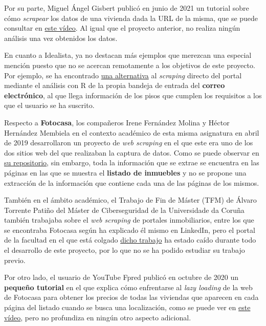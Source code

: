 \documentclass[12pt]{article}
\begin{document}
Por su parte, Miguel Ángel Gisbert publicó en junio de 2021 un tutorial sobre cómo \textit{scrapear} los datos de una vivienda dada la URL de la misma, que se puede consultar en \href{https://www.youtube.com/watch?v=2UyJv5oe570}{este vídeo}. Al igual que el proyecto anterior, no realiza ningún análisis una vez obtenidos los datos. 

En cuanto a Idealista, ya no destacan más ejemplos que merezcan una especial mención puesto que no se acercan remotamente a los objetivos de este proyecto. Por ejemplo, se ha encontrado \href{https://medium.com/@rubenmarcos/crear-una-base-de-datos-de-la-evoluci%C3%B3n-del-mercado-inmobiliario-con-idealista-y-r-y-sin-scraping-1d5025a9d47e}{una alternativa} al \textit{scraping} directo del portal mediante el análisis con R de la propia bandeja de entrada del \textbf{correo electrónico}, al que llega información de los pisos que cumplen los requisitos a los que el usuario se ha suscrito.

Respecto a \textbf{Fotocasa}, los compañeros Irene Fernández Molina y Héctor Hernández Membiela en el contexto académico de esta misma asignatura en abril de 2019 desarrollaron un proyecto de \textit{web scraping} en el que este era uno de los dos sitios web del que realizaban la captura de datos. Como se puede observar en \href{https://github.com/EdelBlau/PEC_TPC}{su repositorio}, sin embargo, toda la información que se extrae se encuentra en las páginas en las que se muestra el \textbf{listado de inmuebles} y no se propone una extracción de la información que contiene cada una de las páginas de los mismos. 

También en el ámbito académico, el Trabajo de Fin de Máster (TFM) de Álvaro Torrente Patiño del Máster de Ciberseguridad de la Universidade da Coruña también trabajaba sobre el \textit{web scraping} de portales inmobiliarios, entre los que se encontraba Fotocasa según ha explicado él mismo en LinkedIn, pero el portal de la facultad en el que está colgado \href{http://castor.det.uvigo.es:8080/xmlui/bitstream/handle/123456789/575/TorrentePatino_Alvaro_TFM_2021.pdf?sequence=1&isAllowed=y}{dicho trabajo} ha estado caído durante todo el desarrollo de este proyecto, por lo que no se ha podido estudiar su trabajo previo. 

Por otro lado, el usuario de YouTube Fpred publicó en octubre de 2020 un \textbf{pequeño tutorial} en el que explica cómo enfrentarse al \textit{lazy loading} de la web de Fotocasa para obtener los precios de todas las viviendas que aparecen en cada página del listado cuando se busca una localización, como se puede ver en \href{https://www.youtube.com/watch?v=WMjV7rF3oX8}{este vídeo}, pero no profundiza en ningún otro aspecto adicional. 
\end{document}
